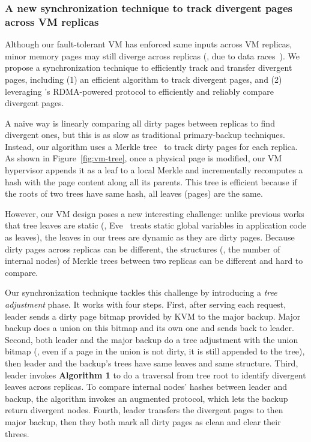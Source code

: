 \vspace{-.15in}\subsubsection{A new synchronization technique to 
track divergent pages across VM replicas}
\label{sec:tracking}\vspace{-.075in}



Although our fault-tolerant VM has enforced same inputs across VM replicas, 
minor memory pages may still diverge across replicas (\eg, due to 
data races~\cite{lu:concurrency-bugs}). We propose a synchronization 
technique to efficiently track and transfer divergent pages, including (1) 
an efficient  algorithm to track divergent pages, and (2) 
leveraging \falcon's RDMA-powered protocol to efficiently and reliably compare 
divergent pages.

A naive way is linearly comparing all  dirty pages between replicas to 
find divergent ones, but this is as slow as traditional primary-backup 
techniques. Instead, our algorithm uses a Merkle tree~\cite{eve:osdi12} to track 
dirty pages for each replica. As shown in Figure~\ref{fig:vm-tree}, once a 
physical page is modified, our VM hypervisor appends it as a leaf to a local 
Merkle and incrementally recomputes a hash with the page content along all its 
parents. This tree is efficient because if the roots of two trees 
have same hash, all leaves (pages) are the same.

However, our VM design poses a new interesting challenge: unlike previous works 
that tree leaves are static (\eg, Eve~\cite{eve:osdi12} treats static global 
variables in application code as leaves), the leaves in our trees are dynamic 
as they are dirty pages. Because dirty pages across replicas can be 
different, the structures (\ie, the number of internal nodes) of Merkle trees 
between two replicas can be different and hard to compare.

Our synchronization technique tackles this challenge by introducing a 
\emph{tree adjustment} phase. It works with four steps. First, after 
serving each request, leader sends a dirty page bitmap provided by KVM to 
the major backup. Major backup does a union on this bitmap and its own one 
and sends back to leader. Second, both leader and the major backup do 
a tree adjustment with the union bitmap (\eg, even if a page in the union is 
not dirty, it is still appended to the tree), then leader and the backup's 
trees have same leaves and same structure. Third, leader invokes 
\textbf{Algorithm 1} to do a  traversal from tree root to identify 
divergent leaves across replicas. To compare internal nodes' hashes between 
leader and backup, the algorithm invokes an augmented \falcon protocol, which 
lets the backup return divergent nodes. Fourth, leader transfers the divergent 
pages to then major backup, then they both mark all dirty pages as clean and 
clear their threes.

